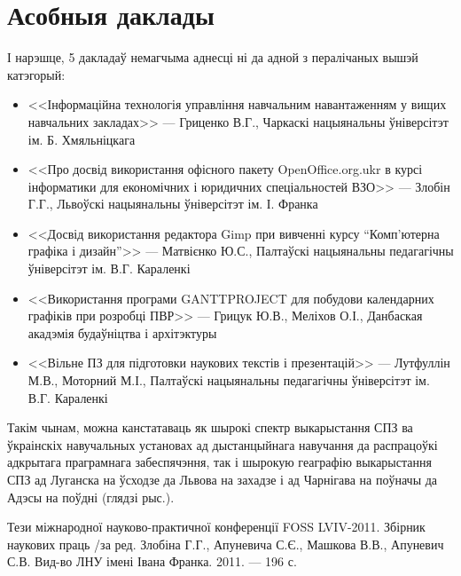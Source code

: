 \documentclass[10pt, a5paper]{article}
\begin{document}
\section{Асобныя даклады}
І нарэшце, 5 дакладаў немагчыма аднесці ні да адной з пералічаных вышэй катэгорый:
\begin{itemize}
\item  <<Інформаційна технологія управління навчальним навантаженням у вищих навчальних закладах>> --- Гриценко В.Г., Чаркаскі нацыянальны ўніверсітэт ім. Б. Хмяльніцкага
\item  <<Про досвід використання офісного  пакету OpenOffice.org.ukr в курсі інформатики для економічних і юридичних спеціальностей ВЗО>> --- Злобін Г.Г., Львоўскі нацыянальны ўніверсітэт ім. І. Франка 
\item  <<Досвід використання  редактора Gimp при вивченні курсу “Комп'ютерна графіка і дизайн”>> --- Матвієнко Ю.С., Палтаўскі нацыянальны педагагічны ўніверсітэт ім. В.Г. Караленкі
\item <<Використання програми GANTTPROJECT для побудови календарних графіків при розробці ПВР>> --- Грицук Ю.В., Меліхов О.І., Данбаская акадэмія будаўніцтва і архітэктуры
\item <<Вільне ПЗ для підготовки наукових текстів і презентацій>> --- Лутфуллін М.В., Моторний М.І., Палтаўскі нацыянальны педагагічны ўніверсітэт ім. В.Г. Караленкі
\end{itemize}

	Такім чынам, можна канстатаваць як шырокі спектр выкарыстання СПЗ ва ўкраінскіх навучальных установах ад дыстанцыйнага навучання да распрацоўкі адкрытага праграмнага забеспячэння, так і шырокую геаграфію выкарыстання СПЗ ад Луганска на ўсходзе да Львова на захадзе і ад Чарнігава на поўначы да Адэсы на поўдні (глядзі рыс.).

\begin{figure}[ht]
\label{pic:fl1}
\end{figure}

\begin{thebibliography}{9}
Тези міжнародної науково-практичної конференції FOSS LVIV-2011. Збірник наукових праць /за ред. Злобіна Г.Г., Апуневича С.Є., Машкова В.В., Апуневич С.В. Вид-во ЛНУ імені Івана Франка. 2011. --- 196 с.
\end{thebibliography}
\end{document}
